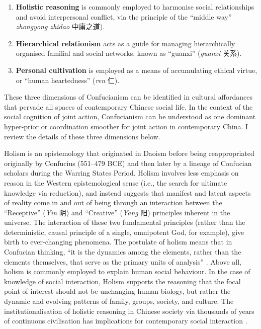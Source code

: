 \begin{CJK}{UTF8}{gbsn}
\begin{enumerate}
  \item \textbf{Holistic reasoning} is commonly employed to harmonise social relationships and avoid interpersonal conflict, via the principle of the  ``middle way'' \textit{zhongyong zhidao} 中庸之道).
  \item \textbf{Hierarchical relationism} acts as a guide for managing hierarchically organised familial and social networks, known as ``guanxi'' (\textit{guanxi} 关系).
  \item \textbf{Personal cultivation} is employed as a means of accumulating ethical virtue, or ``human heartedness'' (\textit{ren} 仁).
\end{enumerate}

These three dimensions of Confucianism can be identified in cultural affordances that pervade all spaces of contemporary Chinese social life.  In the context of the social cognition of joint action, Confucianism can be understood as one dominant hyper-prior or coordination smoother for joint action in contemporary China.  I review the details of these three dimensions below.

Holism is an epistemology that originated in Daoism before being reappropriated originally by Confucius (551–479 BCE) and then later by a lineage of Confucian scholars during the Warring States Period.  Holism involves less emphasis on reason in the Western epistemological sense (i.e., the search for ultimate knowledge via reduction), and instead suggests that manifest and latent aspects of reality come in and out of being through an interaction between the ``Receptive'' (\textit{Yin} 阴) and ``Creative'' (\textit{Yang} 阳) principles inherent in the universe.  The interaction of these two fundamental principles (rather than the deterministic, causal principle of a single, omnipotent God, for example), give birth to ever-changing phenomena.  The postulate of holism means that in Confucian thinking, ``it is the dynamics among the elements, rather than the elements themselves, that serve as the primary units of analysis'' \citep[156]{Ji2010}. Above all, holism is commonly employed to explain human social behaviour.  In the case of knowledge of social interaction, Holism supports the reasoning that the focal point of interest should not be unchanging human biology, but rather the dynamic and evolving patterns of family, groups, society, and culture.  The institutionalisation of holistic reasoning in Chinese society via thousands of years of continuous civilisation has implications for contemporary social interaction \cite{Nisbett2003}.



\end{CJK}
